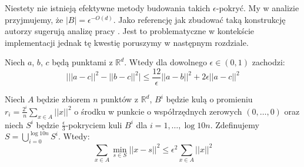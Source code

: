 \noindent
Niestety nie istnieją efektywne metody budowania takich $\epsilon$-pokryć.
My w analizie przyjmujemy, że  $|B| = \epsilon^{-O(d)}$.
Jako referencję jak zbudować taką konstrukcję autorzy \cite{DBLP:journals/ki/MunteanuS18} sugerują analizę pracy \cite{chazelle_2000}.
Jest to problematyczne w kontekście implementacji jednak tę kwestię poruszymy w następnym rozdziale.
\begin{lemma}{\cite{DBLP:journals/ki/MunteanuS18}}
    Niech $a$, $b$, $c$ będą punktami z $\mathbb{R}^{d}$.
    Wtedy dla dowolnego $\epsilon \in (0,1)$ zachodzi:
    \begin{equation}
        \Big| ||a-c||^{2} - ||b-c||^{2} \Big| \leq \frac{12}{\epsilon} ||a-b||^2 + 2\epsilon||a-c||^2
    \end{equation}
\end{lemma}
\begin{lemma}
    Niech $A$ będzie zbiorem $n$ punktów z $\mathbb{R}^d$, $B^{i}$ będzie kulą o promieniu $r_{i} = \frac{2^{i}}{n}\sum_{x \in A} ||x||^{2}$ o środku w punkcie o współrzędnych zerowych $(0, \dots, 0)$ oraz niech $S^{i}$ będzie $\frac{\epsilon}{3}$-pokryciem kuli $B^{i}$ dla $i = 1, \dots, \log10n$.
    Zdefinujemy $S = \bigcup_{i=0}^{\log 10n} S^{i}$. 
    Wtedy:
    \begin{equation}
        \sum_{x\in A} \min_{s \in S} ||x - s||^{2} \leq \epsilon^{2} \sum_{x \in A} ||x||^{2}
    \end{equation}
\end{lemma}

